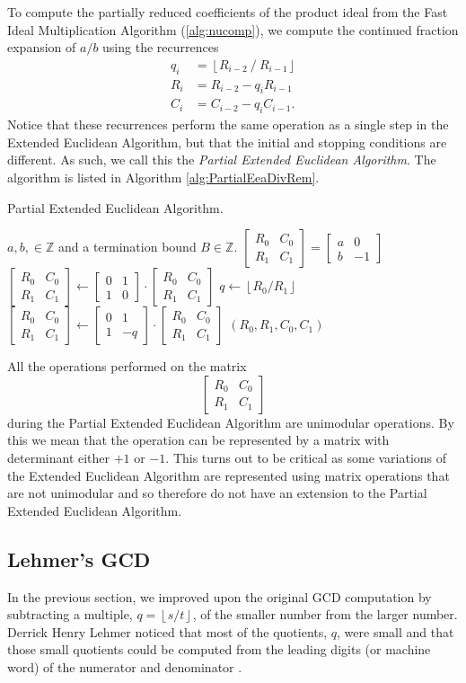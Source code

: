 \documentclass{ucalgthes1}
\theoremstyle{plain}
\theoremstyle{definition}
\newcommand{\ZZ}{\mathbb{Z}}
\newcommand{\matrixtt}[4]{\left[ \begin{array}{rr} #1 & #2 \\ #3 & #4 \end{array} \right]}
\newcommand{\floor}[1]{\left\lfloor #1 \right\rfloor}
\begin{document}
To compute the partially reduced coefficients of the product ideal from the Fast Ideal Multiplication Algorithm (\ref{alg:nucomp}), we compute the continued fraction expansion of $a/b$ using the recurrences
\begin{align*}
	q_i &= \floor{R_{i-2} ~/~ R_{i-1}} \\
	R_i &= R_{i-2} - q_i R_{i-1} \\
	C_i &= C_{i-2} - q_i C_{i-1}.
\end{align*}
Notice that these recurrences perform the same operation as a single step in the Extended Euclidean Algorithm, but that the initial and stopping conditions are different.  As such, we call this the \emph{Partial Extended Euclidean Algorithm}.    The algorithm is listed in Algorithm \ref{alg:PartialEeaDivRem}.

\begin{algorithm}[h]
\caption{Partial Extended Euclidean Algorithm.}
\label{alg:PartialEeaDivRem}
\begin{algorithmic}[1]
\REQUIRE $a,b, \in \ZZ$ and a termination bound $B \in \ZZ$.
\STATE $\matrixtt{R_0}{C_0}{R_1}{C_1} = \matrixtt{a}{0}{b}{-1}$
	\STATE $\matrixtt{R_0}{C_0}{R_1}{C_1} \gets
	        \matrixtt{0}{1}{1}{0} \cdot \matrixtt{R_0}{C_0}{R_1}{C_1}$
\ENDIF
{}
	\STATE $q \gets \floor{R_0 / R_1}$
	\STATE $\matrixtt{R_0}{C_0}{R_1}{C_1} \gets \matrixtt{0}{1}{1}{-q} \cdot
		    \matrixtt{R_0}{C_0}{R_1}{C_1}$ 
\ENDWHILE
\RETURN $(R_0, R_1, C_0, C_1)$
\end{algorithmic}
\end{algorithm}

All the operations performed on the matrix
\[
\matrixtt{R_0}{C_0}{R_1}{C_1}
\]
during the Partial Extended Euclidean Algorithm are unimodular operations. By this we mean that the operation can be represented by a matrix with determinant either $+1$ or $-1$.  This turns out to be critical as some variations of the Extended Euclidean Algorithm are represented using matrix operations that are not unimodular and so therefore do not have an extension to the Partial Extended Euclidean Algorithm.

\subsection{Lehmer's GCD}

In the previous section, we improved upon the original GCD computation by subtracting a multiple, $q = \floor{s / t}$, of the smaller number from the larger number.  Derrick Henry Lehmer noticed that most of the quotients, $q$, were small and that those small quotients could be computed from the leading digits (or machine word) of the numerator and denominator \cite{Lehmer1938}.
\end{document}
